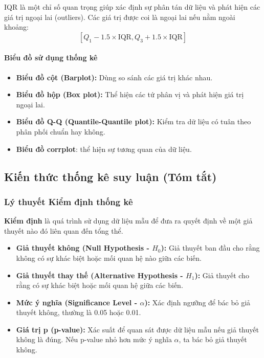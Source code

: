 IQR là một chỉ số quan trọng giúp xác định sự phân tán dữ liệu và phát hiện các giá trị ngoại lai (outliers). Các giá trị được coi là ngoại lai nếu nằm ngoài khoảng:
\[
[Q_1 - 1.5 \times \text{IQR}, Q_3 + 1.5 \times \text{IQR}]
\]

\paragraph{Biểu đồ sử dụng thống kê}
\begin{itemize}
    \item \textbf{Biểu đồ cột (Barplot):} Dùng so sánh các giá trị khác nhau.
    \item \textbf{Biểu đồ hộp (Box plot):} Thể hiện các tứ phân vị và phát hiện giá trị ngoại lai.
    \item \textbf{Biểu đồ Q-Q (Quantile-Quantile plot):} Kiểm tra dữ liệu có tuân theo phân phối chuẩn hay không.
    \item \textbf{Biểu đồ corrplot}: thể hiện sự tương quan của dữ liệu. 
\end{itemize}

\subsection{Kiến thức thống kê suy luận (Tóm tắt)}
\subsubsection{Lý thuyết Kiểm định thống kê}
\begin{boxH}
    \textbf{Kiểm định} là quá trình sử dụng dữ liệu mẫu để đưa ra quyết định về một giả thuyết nào đó liên quan đến tổng thể.
  \begin{itemize}
    \item \textbf{Giả thuyết không (Null Hypothesis - $H_0$):} Giả thuyết ban đầu cho rằng không có sự khác biệt hoặc mối quan hệ nào giữa các biến.
    \item \textbf{Giả thuyết thay thế (Alternative Hypothesis - $H_1$):} Giả thuyết cho rằng có sự khác biệt hoặc mối quan hệ giữa các biến.
    \item \textbf{Mức ý nghĩa (Significance Level - $\alpha$):} Xác định ngưỡng để bác bỏ giả thuyết không, thường là 0.05 hoặc 0.01.
    \item \textbf{Giá trị p (p-value):} Xác suất để quan sát được dữ liệu mẫu nếu giả thuyết không là đúng. Nếu p-value nhỏ hơn mức ý nghĩa $\alpha$, ta bác bỏ giả thuyết không.
  \end{itemize}
\end{boxH}
